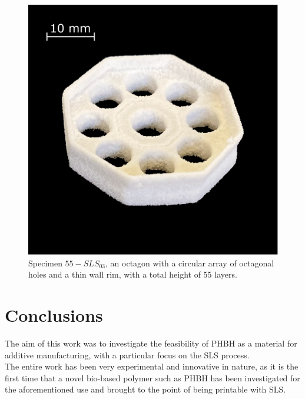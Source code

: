 \documentclass{article}
\begin{document}
        \begin{figure}[ht]
            \centering
            \includegraphics[width=\textwidth]{Pictures/Printed_parts/Fixed/octagon_holes.eps}
            \caption{Specimen $55-SLS_{03}$, an octagon with a circular array of octagonal holes and a thin wall rim, with a total height of 55 layers.}
            \label{fig:printed_specimens_octagonholes}
        \end{figure}
        

        \clearpage

    
    \section{Conclusions\label{conclusions}}

    The aim of this work was to investigate the feasibility of PHBH as a 
    material for additive manufacturing, with a particular focus on the SLS process. \\ 

    The entire work has been very experimental and innovative in nature, as it is the first time that a novel bio-based polymer such as PHBH has been investigated 
    for the aforementioned use and brought to the point of being printable with SLS. \\
    
\end{document}
